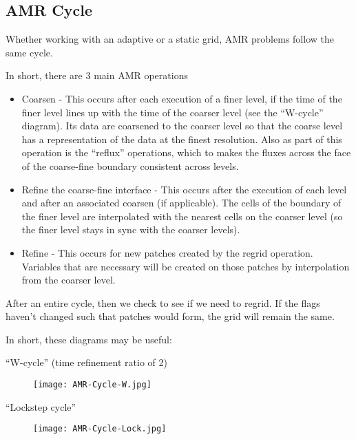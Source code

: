 \subsection{AMR Cycle}

Whether working with an adaptive or a static grid, AMR problems follow
the same cycle.

In short, there are 3 main AMR operations
\begin{itemize}

\item Coarsen - This occurs after each execution of a finer level, if
  the time of the finer level lines up with the time of the coarser
  level (see the ``W-cycle'' diagram). Its data are coarsened to the
  coarser level so that the coarse level has a representation of the
  data at the finest resolution. Also as part of this operation is the
  ``reflux'' operations, which to makes the fluxes across the face of
  the coarse-fine boundary consistent across levels.
\item Refine the coarse-fine interface - This occurs after the
  execution of each level and after an associated coarsen (if
  applicable). The cells of the boundary of the finer level are
  interpolated with the nearest cells on the coarser level (so the
  finer level stays in sync with the coarser levels).
\item Refine - This occurs for new patches created by the regrid
  operation. Variables that are necessary will be created on those
  patches by interpolation from the coarser level.
\end{itemize}

After an entire cycle, then we check to see if we need to regrid. If the flags haven't changed such that patches would form, the grid will remain the same.

In short, these diagrams may be useful:

``W-cycle'' (time refinement ratio of 2)

\begin{figure}[h]
  \centering
  \texttt{[image: AMR-Cycle-W.jpg]}
  \caption{}
  \label{}
\end{figure}

``Lockstep cycle''

\begin{figure}[h]
  \centering
  \texttt{[image: AMR-Cycle-Lock.jpg]}
  \caption{}
  \label{}
\end{figure}
